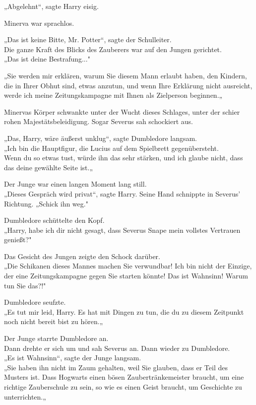 {„Abgelehnt“, sagte Harry eisig.

Minerva war sprachlos.

„Das ist keine Bitte, Mr. Potter“, sagte der Schulleiter.\\ Die ganze Kraft des Blicks des Zauberers war auf den Jungen gerichtet.\\ „Das ist deine Bestrafung..."

„Sie werden mir erklären, warum Sie diesem Mann erlaubt haben, den Kindern, die in Ihrer Obhut sind, etwas anzutun, und wenn Ihre Erklärung nicht ausreicht, werde ich meine Zeitungskampagne mit Ihnen als Zielperson beginnen.„

Minervas Körper schwankte unter der Wucht dieses Schlages, unter der schier rohen Majestätsbeleidigung. Sogar Severus sah schockiert aus.

„Das, Harry, wäre äußerst unklug“, sagte Dumbledore langsam.\\ „Ich bin die Hauptfigur, die Lucius auf dem Spielbrett gegenübersteht.\\ Wenn du so etwas tust, würde ihn das sehr stärken, und ich glaube nicht, dass das deine gewählte Seite ist.„

Der Junge war einen langen Moment lang still.\\ „Dieses Gespräch wird privat“, sagte Harry. Seine Hand schnippte in Severus' Richtung. „Schick ihn weg."

Dumbledore schüttelte den Kopf.\\ „Harry, habe ich dir nicht gesagt, dass Severus Snape mein vollstes Vertrauen genießt?"

Das Gesicht des Jungen zeigte den Schock darüber.\\ „Die Schikanen dieses Mannes machen Sie verwundbar! Ich bin nicht der Einzige, der eine Zeitungskampagne gegen Sie starten könnte! Das ist Wahnsinn! Warum tun Sie das?!"

Dumbledore seufzte.\\ „Es tut mir leid, Harry. Es hat mit Dingen zu tun, die du zu diesem Zeitpunkt noch nicht bereit bist zu hören.„

Der Junge starrte Dumbledore an.\\ Dann drehte er sich um und sah Severus an. Dann wieder zu Dumbledore.\\ „Es ist Wahnsinn“, sagte der Junge langsam.\\ „Sie haben ihn nicht im Zaum gehalten, weil Sie glauben, dass er Teil des Musters ist. Dass Hogwarts einen bösen Zaubertränkemeister braucht, um eine richtige Zauberschule zu sein, so wie es einen Geist braucht, um Geschichte zu unterrichten.„

}
